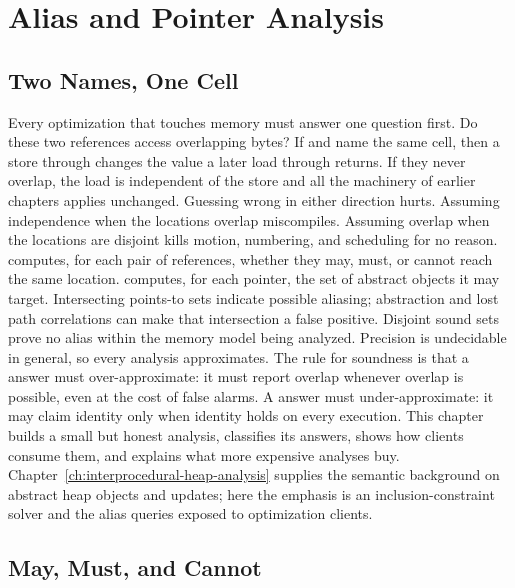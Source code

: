 \chapter{Alias and Pointer Analysis}
\label{ch:ch20-alias-analysis}

\section{Two Names, One Cell}
\label{sec:ch20-two-names}

Every optimization that touches memory must answer one question first.
Do these two references access overlapping bytes?
If  and  name the same cell, then a store through  changes the value a later load through  returns.
If they never overlap, the load is independent of the store and all the machinery of earlier chapters applies unchanged.
Guessing wrong in either direction hurts.
Assuming independence when the locations overlap miscompiles.
Assuming overlap when the locations are disjoint kills motion, numbering, and scheduling for no reason.
 computes, for each pair of references, whether they may, must, or cannot reach the same location.
 computes, for each pointer, the set of abstract objects it may target.
Intersecting points-to sets indicate possible aliasing; abstraction and lost path correlations can make that intersection a false positive.
Disjoint sound sets prove no alias within the memory model being analyzed.
Precision is undecidable in general, so every analysis approximates.
The rule for soundness is that a  answer must over-approximate: it must report overlap whenever overlap is possible, even at the cost of false alarms.
A  answer must under-approximate: it may claim identity only when identity holds on every execution.
This chapter builds a small but honest analysis, classifies its answers, shows how clients consume them, and explains what more expensive analyses buy.
Chapter~\ref{ch:interprocedural-heap-analysis} supplies the semantic background on abstract heap objects and updates; here the emphasis is an inclusion-constraint solver and the alias queries exposed to optimization clients.

\section{May, Must, and Cannot}
\label{sec:ch20-relations}

